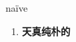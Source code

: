 
\begin{frame}
{\huge naïve}
\begin{center}
\begin{enumerate}\Large
  \item \textbf{天真纯朴的}
\end{enumerate}
\end{center}
\end{frame}
